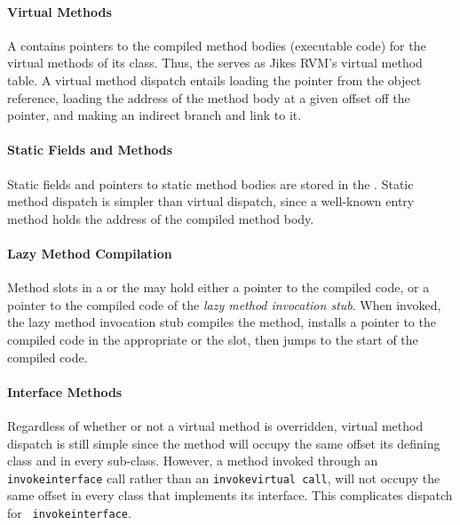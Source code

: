 \paragraph{Virtual Methods}
A  contains pointers to the compiled method 
bodies (executable code) for the virtual methods of its class. 
Thus, the  serves as Jikes RVM's virtual method table.
A virtual method dispatch entails loading the  pointer from 
the object reference, loading the address of the method
body at a given offset off the  pointer, and making an indirect
branch and link to it.

\paragraph{Static Fields and Methods} 
Static fields and pointers to static method bodies are stored in the . 
Static method dispatch is simpler than virtual dispatch, since 
a well-known  entry method holds the address of the compiled method
body. 

\paragraph{Lazy Method Compilation}\label{par:lazy}
Method slots in a  or the  may hold either
a pointer to the compiled code, 
or a pointer to the compiled code of the {\em lazy method invocation stub}.
When invoked, the lazy method invocation stub compiles the 
method, installs a pointer to the compiled code in the appropriate
 or the  slot, then 
jumps to the start of the compiled code. 

\paragraph{Interface Methods}
Regardless of whether or not a virtual method is overridden,
virtual method dispatch is still simple since the method will occupy 
the same  offset its defining class and in every sub-class.
However, a method invoked through an {\tt invokeinterface} call rather than
an {\tt invokevirtual call}, will not occupy the same  offset in every class that 
implements its interface.  This complicates dispatch for {\tt
invokeinterface}.

